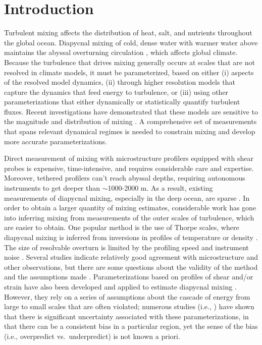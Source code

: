 \documentclass{ametsoc}
\begin{document}


\section{Introduction}

Turbulent mixing affects the distribution of heat, salt, and nutrients throughout the global ocean. Diapycnal mixing  of cold, dense water with warmer water above maintains the abyssal overturning circulation \citep{munk66,munkwunsch98}, which affects global climate. Because the turbulence that drives mixing generally occurs at scales that are not resolved in climate models, it must be parameterized, based on either (i) aspects of the resolved model dynamics, (ii) through higher resolution models that capture the dynamics that feed energy to turbulence, or (iii) using other parameterizations that either dynamically or statistically quantify turbulent fluxes. Recent investigations have demonstrated that these models are sensitive to the magnitude and distribution of mixing \citep{meletetal13}. A comprehensive set of measurements that spans relevant dynamical regimes is needed to constrain mixing and develop more accurate parameterizations.

Direct measurement of mixing with microstructure profilers equipped with shear probes is expensive, time-intensive, and requires considerable care and expertise. Moreover, tethered profilers can't reach abyssal depths, requiring autonomous instruments to get deeper than $\sim$1000-2000 m.  As a result, existing measurements of diapycnal mixing, especially in the deep ocean, are sparse \citep{waterhouseetal14}. In order to obtain a larger quantity of mixing estimates, considerable work has gone into inferring mixing from measurements of the outer scales of turbulence, which are easier to obtain. One popular method is the use of Thorpe scales, where diapycnal mixing is inferred from inversions in profiles of temperature or density  \citep{thorpe77,dillon82}. The size of resolvable overturn is limited by the profiling speed and instrument noise \citep{galbraithkelley96}. Several studies indicate relatively good agreement with microstructure and other observations, but there are some questions about the validity of the method and the assumptions made \citep{materetal15,scotti15}. Parameterizations based on profiles of shear and/or strain have also been developed and applied to estimate diapycnal mixing \citep{gregg89a,kunzeetal06,polzinetal13,whalenetal12,whalenetal15}.  However, they rely on a series of assumptions about the cascade of energy from large to small scales that are often violated; numerous studies (i.e., \cite{watermanetal13}) have shown that there is significant uncertainty associated with these parameterizations, in that there can be a consistent bias in a particular region, yet the sense of the bias (i.e., overpredict vs.\ underpredict) is not known a priori. 
\end{document}
